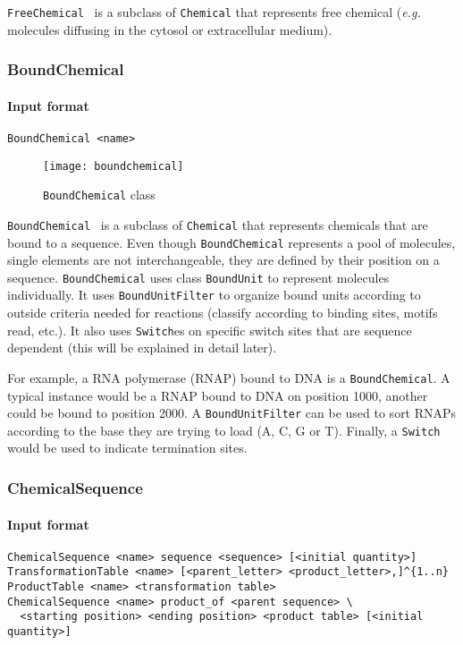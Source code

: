 \texttt{FreeChemical}~ is a subclass of \texttt{Chemical}
that represents free chemical (\textit{e.g.} molecules diffusing in the cytosol or extracellular medium).

\subsubsection{BoundChemical}

\paragraph{Input format}
\begin{verbatim}
BoundChemical <name>
\end{verbatim}

\begin{figure}[!h]
  \centering
  \texttt{[image: boundchemical]}
  \caption{\texttt{BoundChemical} class}
  \label{fig:bound_chemical}
\end{figure}

\texttt{BoundChemical}~ is a subclass of \texttt{Chemical}
that represents chemicals that are bound to a sequence.
Even though \texttt{BoundChemical} represents a pool of molecules,
single elements are not interchangeable,
they are defined by their position on a sequence.
\texttt{BoundChemical} uses class \texttt{BoundUnit} to represent molecules individually.
It uses \texttt{BoundUnitFilter} to organize bound units according to outside criteria
needed for reactions (classify according to binding sites, motifs read, etc.).
It also uses \texttt{Switch}es on specific switch sites that are sequence dependent
(this will be explained in detail later).

For example, a RNA polymerase (RNAP) bound to DNA is a \texttt{BoundChemical}.
A typical instance would be a RNAP bound to DNA on position 1000,
another could be bound to position 2000.
A \texttt{BoundUnitFilter} can be used to sort RNAPs according to the base
they are trying to load (A, C, G or T).
Finally, a \texttt{Switch} would be used to indicate termination sites.

\subsubsection{ChemicalSequence}

\paragraph{Input format}
\begin{verbatim}
ChemicalSequence <name> sequence <sequence> [<initial quantity>]
TransformationTable <name> [<parent_letter> <product_letter>,]^{1..n}
ProductTable <name> <transformation table>
ChemicalSequence <name> product_of <parent sequence> \
  <starting position> <ending position> <product table> [<initial quantity>]
\end{verbatim}

